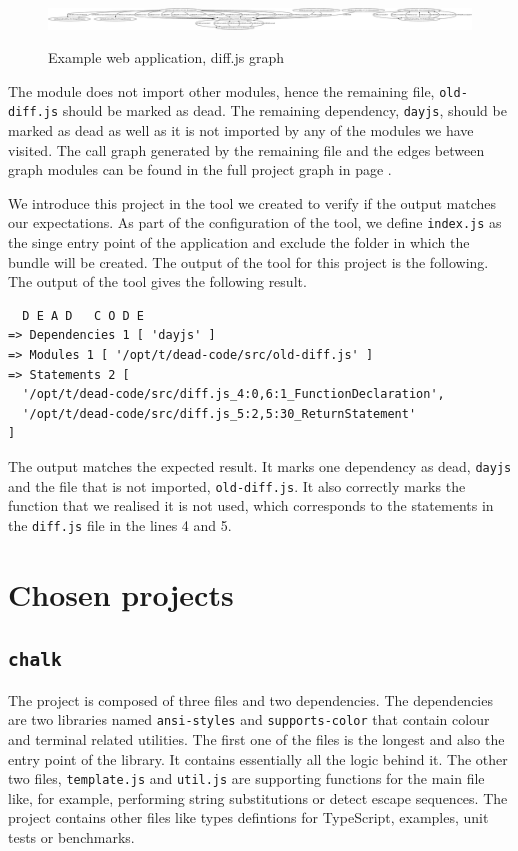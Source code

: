 \documentclass{uvamscse}
\begin{document}
\begin{figure}[H]
  \centering
    \includegraphics[width=\textwidth]{dead-code_graph_diff.eps}
    \label{fig:deadcode}
   \caption{Example web application, diff.js graph}
\end{figure}

The module does not import other modules, hence the remaining file, \texttt{old-diff.js} should be marked as dead. The remaining dependency, \texttt{dayjs}, should be marked as dead as well as it is not imported by any of the modules we have visited. The call graph generated by the remaining file and the edges between graph modules can be found in the full project graph in page \pageref{fig:deadcode}.

We introduce this project in the tool we created to verify if the output matches our expectations. As part of the configuration of the tool, we define \texttt{index.js} as the singe entry point of the application and exclude the folder in which the bundle will be created. The output of the tool for this project is the following. The output of the tool gives the following result.

\begin{verbatim}
  D E A D   C O D E
=> Dependencies 1 [ 'dayjs' ]
=> Modules 1 [ '/opt/t/dead-code/src/old-diff.js' ]
=> Statements 2 [
  '/opt/t/dead-code/src/diff.js_4:0,6:1_FunctionDeclaration',
  '/opt/t/dead-code/src/diff.js_5:2,5:30_ReturnStatement'
]
\end{verbatim}

The output matches the expected result. It marks one dependency as dead, \texttt{dayjs} and the file that is not imported, \texttt{old-diff.js}. It also correctly marks the function that we realised it is not used, which corresponds to the statements in the \texttt{diff.js} file in the lines 4 and 5.

\section{Chosen projects}

\subsection{\texttt{chalk}}
The project is composed of three files and two dependencies. The dependencies are two libraries named \texttt{ansi-styles} and \texttt{supports-color} that contain colour and terminal related utilities. The first one of the files is the longest and also the entry point of the library. It contains essentially all the logic behind it. The other two files, \texttt{template.js} and \texttt{util.js} are supporting functions for the main file like, for example, performing string substitutions or detect escape sequences. The project contains other files like types defintions for TypeScript, examples, unit tests or benchmarks.
\end{document}
